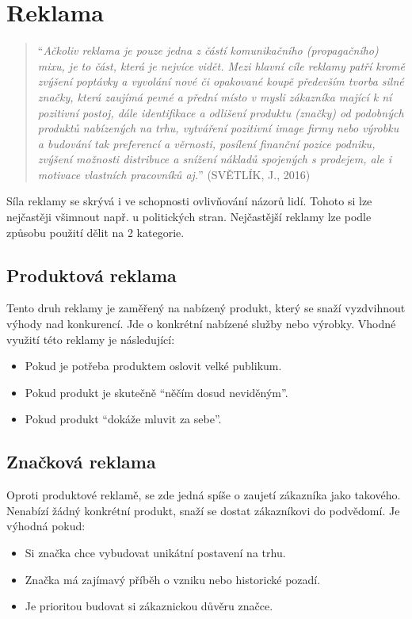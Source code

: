 \section{Reklama}
    \begin{quote}
        \enquote{\emph{Ačkoliv reklama je pouze jedna z částí komunikačního (propagačního) mixu, je to část, která je nejvíce vidět.
        Mezi hlavní cíle reklamy patří kromě zvýšení poptávky a vyvolání nové či opakované koupě především tvorba silné značky,
        která zaujímá pevné a přední místo v mysli zákazníka mající k ní pozitivní postoj, dále identifikace a
        odlišení produktu (značky) od podobných produktů nabízených na trhu,
        vytváření pozitivní image firmy nebo výrobku a budování tak preferencí a věrnosti, posílení finanční pozice podniku,
        zvýšení možnosti distribuce a snížení nákladů spojených s prodejem, ale i motivace vlastních pracovníků aj.}}
        (SVĚTLÍK, J., 2016) \cite{svetlik:marketing}
    \end{quote}
    

    Síla reklamy se skrývá i ve schopnosti ovlivňování názorů lidí. Tohoto si lze nejčastěji všimnout např.
    u politických stran. Nejčastější reklamy lze podle způsobu použití dělit na 2 kategorie. \cite{marketing:product-vs-brand}

    \subsection{Produktová reklama}
    Tento druh reklamy je zaměřený na nabízený produkt, který se snaží vyzdvihnout výhody nad konkurencí.
    Jde o konkrétní nabízené služby nebo výrobky. Vhodné využití této reklamy je následující:
    \begin{itemize}
        \item Pokud je potřeba produktem oslovit velké publikum.
        \item Pokud produkt je skutečně \enquote{něčím dosud neviděným}.
        \item Pokud produkt \enquote{dokáže mluvit za sebe}.
    \end{itemize}

    \subsection{Značková reklama}
    Oproti produktové reklamě, se zde jedná spíše o zaujetí zákazníka jako takového. Nenabízí žádný konkrétní produkt,
    snaží se dostat zákazníkovi do podvědomí. Je výhodná pokud:
    \begin{itemize}
        \item Si značka chce vybudovat unikátní postavení na trhu. 
        \item Značka má zajímavý příběh o vzniku nebo historické pozadí. 
        \item Je prioritou budovat si zákaznickou důvěru značce. 
    \end{itemize}

